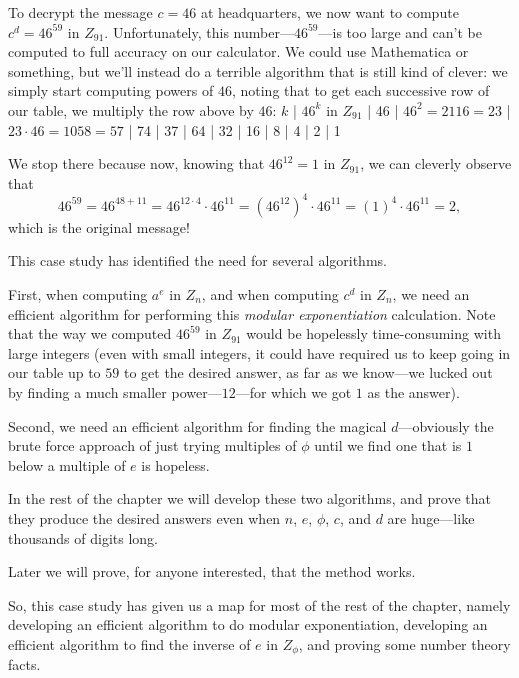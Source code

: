 To decrypt the message $c=46$ at headquarters, we now
want to compute $c^d = 46^{59}$ in 
$Z_{91}$.  Unfortunately, this number---$46^{59}$---is too large and can't be computed to full
accuracy on our calculator.  We could use Mathematica or something, but we'll instead do a
terrible algorithm that is still kind of clever:  we simply start computing powers of $46$,
noting that to get each successive row of our table, we multiply the row above by $46$:
\medskip
{}
$k$ | $46^k$ in $Z_{91}$  | 46  | $46^2 = 2116 = 23$  | $23\cdot 46 = 1058 = 57$  | 74  | 37  | 64  | 32  | 16  | 8  | 4  | 2  | 1
\endruledtable
\medskip

We stop there because now, knowing that $46^{12} = 1$ in $Z_{91}$,
we can cleverly observe that
$$
46^{59} = 46^{48+11} = 46^{12 \cdot 4} \cdot 46^{11}
= \left(46^{12}\right)^4 \cdot 46^{11}
= (1)^4 \cdot 46^{11}
= 2,
$$
which is the original message!
\medskip

This case study has identified the need for several algorithms.
\medskip

First, when computing $a^e$ in $Z_n$, and when computing $c^d$ in $Z_n$, we
need an efficient algorithm for performing this {\it modular exponentiation\/} calculation.
Note that the way we computed $46^{59}$ in $Z_{91}$ would be hopelessly time-consuming
with large integers (even with small integers, it could have required us to keep going in our
table up to $59$ to get the desired answer, as far as we know---we lucked out by finding a
much smaller power---$12$---for which we got $1$ as the answer).
\medskip

Second, we need an efficient algorithm for finding the magical $d$---obviously the brute force
approach of just trying multiples of $\phi$ until we find one that is $1$ below a multiple of $e$
is hopeless.
\medskip

In the rest of the chapter we will develop these two algorithms, and prove that they produce the
desired answers even when $n$, $e$, $\phi$, $c$, and $d$ are huge---like thousands of digits long.
\medskip
\Outdent

Later we will prove, for anyone interested, that the method works.
\medskip

So, this case study has given us a map for most of the rest of the chapter, namely
developing an efficient algorithm to do modular exponentiation, developing an efficient
algorithm to find the inverse of $e$ in $Z_{\phi}$, and proving some number theory facts.
\medskip

